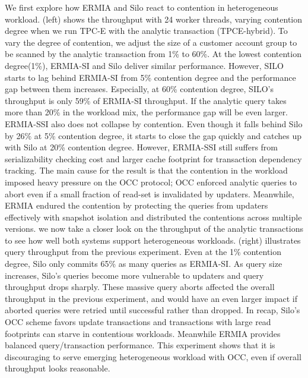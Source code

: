 
We first explore how ERMIA and Silo react to contention in heterogeneous workload.  (left) shows the throughput with 24 worker threads, varying contention degree when we run TPC-E with the analytic transaction (TPCE-hybrid). To vary the degree of contention, we adjust the size of a customer account group to be scanned by the analytic transaction from 1\% to 60\%. At the lowest contention degree(1\%), ERMIA-SI and Silo deliver similar performance. However, SILO starts to lag behind ERMIA-SI from 5\% contention degree and the performance gap between them increases. Especially, at 60\% contention degree, SILO's throughput is only 59\% of ERMIA-SI throughput. If the analytic query takes more than 20\% in the workload mix, the performance gap will be even larger. ERMIA-SSI also does not collapse by contention. Even though it falls behind Silo by 26\% at 5\% contention degree, it starts to close the gap quickly and catches up with Silo at 20\% contention degree. However, ERMIA-SSI still suffers from serializability checking cost and larger cache footprint for transaction dependency tracking.
The main cause for the result is that the contention in the workload imposed heavy pressure on the OCC protocol; OCC enforced analytic queries to abort even if a small fraction of read-set is invalidated by updaters. Meanwhile, ERMIA endured the contention by protecting the queries from updaters effectively with snapshot isolation and distributed the contentions across multiple versions. 
we now take a closer look on the throughput of the analytic transactions to see how well both systems support heterogeneous workloads.  (right) illustrates query throughput from the previous experiment. Even at the 1\% contention degree, Silo only commits 65\% as many queries as ERMIA-SI. As query size increases, Silo's queries become more vulnerable to updaters and query throughput drops sharply. These massive query aborts affected the overall throughput in the previous experiment, and would have an even larger impact if aborted queries were retried until successful rather than dropped. In recap, Silo's OCC scheme favors update transactions and transactions with large read footprints can starve in contentious workloads. Meanwhile ERMIA provides balanced query/transaction performance. This experiment shows that it is discouraging to serve emerging heterogeneous workload with OCC, even if overall throughput looks reasonable. 
   
